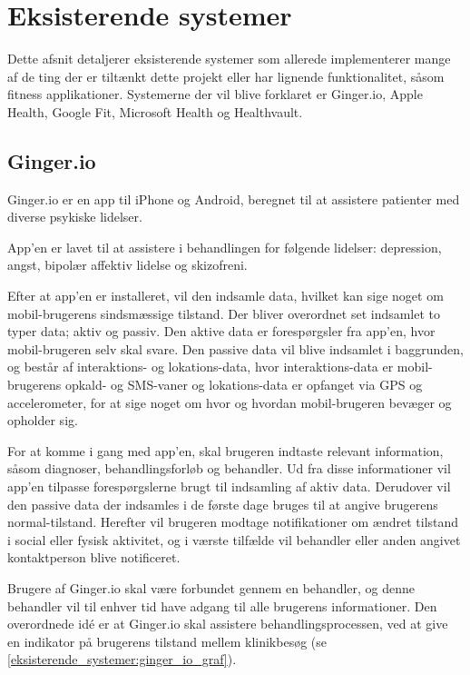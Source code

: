 \chapter{Eksisterende systemer}
Dette afsnit detaljerer eksisterende systemer som allerede implementerer mange af de ting der er tiltænkt dette projekt eller har lignende funktionalitet, såsom fitness applikationer. 
Systemerne der vil blive forklaret er Ginger.io, Apple Health, Google Fit, Microsoft Health og Healthvault.

\section{Ginger.io}
Ginger.io er en app til iPhone og Android, beregnet til at assistere patienter med diverse psykiske lidelser.\cite{ginger_dot_io}\cite{gingerio_mit}\cite{gingerio_dailymail}


App'en er lavet til at assistere i behandlingen for følgende lidelser: depression, angst, bipolær affektiv lidelse og skizofreni.

Efter at app'en er installeret, vil den indsamle data, hvilket kan sige noget om mobil-brugerens sindsmæssige tilstand.
Der bliver overordnet set indsamlet to typer data; aktiv og passiv.
Den aktive data er forespørgsler fra app'en, hvor mobil-brugeren selv skal svare.
Den passive data vil blive indsamlet i baggrunden, og består af interaktions- og lokations-data, hvor interaktions-data er mobil-brugerens opkald- og SMS-vaner og lokations-data er opfanget via GPS og accelerometer, for at sige noget om hvor og hvordan mobil-brugeren bevæger og opholder sig.

For at komme i gang med app'en, skal brugeren indtaste relevant information, såsom diagnoser, behandlingsforløb og behandler.
Ud fra disse informationer vil app'en tilpasse forespørgslerne brugt til indsamling af aktiv data.
Derudover vil den passive data der indsamles i de første dage bruges til at angive brugerens normal-tilstand.
Herefter vil brugeren modtage notifikationer om ændret tilstand i social eller fysisk aktivitet, og i værste tilfælde vil behandler eller anden angivet kontaktperson blive notificeret.

Brugere af Ginger.io skal være forbundet gennem en behandler, og denne behandler vil til enhver tid have adgang til alle brugerens informationer.
Den overordnede idé er at Ginger.io skal assistere behandlingsprocessen, ved at give en indikator på brugerens tilstand mellem klinikbesøg (se \cref{eksisterende_systemer:ginger_io_graf}).

